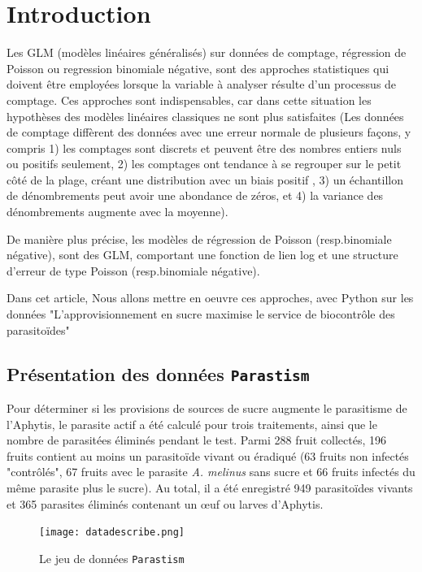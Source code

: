 \documentclass[12pt]{article}
\begin{document}
\newpage

\section{Introduction}

    Les GLM (modèles linéaires généralisés) sur données de comptage, régression de Poisson ou regression binomiale négative, sont des approches statistiques qui doivent être employées lorsque la variable à analyser résulte d’un processus de comptage. Ces approches sont indispensables, car dans cette situation les hypothèses des modèles linéaires classiques ne sont plus satisfaites (Les données de comptage diffèrent des données avec une erreur normale de plusieurs façons, y compris 1) les comptages sont discrets et peuvent être des nombres entiers nuls ou positifs seulement, 2) les comptages ont tendance à se regrouper sur le petit côté de la plage, créant une distribution avec un biais positif , 3) un échantillon de dénombrements peut avoir une abondance de zéros, et 4) la variance des dénombrements augmente avec la moyenne).
    
    De manière plus précise, les modèles de régression de Poisson (resp.binomiale négative), sont des GLM, comportant une fonction de lien log et une structure d’erreur de type Poisson (resp.binomiale négative).
    
    Dans cet article, Nous allons mettre en oeuvre ces approches, avec Python sur les données "L'approvisionnement en sucre maximise le service de biocontrôle des parasitoïdes"
    
    
    \subsection{Présentation des données \texttt{Parastism}}
    Pour déterminer si les provisions de sources de sucre augmente le parasitisme de l'Aphytis,  le parasite actif a été calculé pour trois traitements, ainsi que le nombre de parasitées éliminés pendant le test.
    Parmi 288 fruit collectés, 196 fruits contient au moins un parasitoïde vivant ou éradiqué (63 fruits non infectés "contrôlés", 67 fruits avec le parasite \textit{A. melinus} sans sucre et 66 fruits infectés du même parasite plus le sucre). Au total, il a été enregistré 949 parasitoïdes vivants et 365 parasites éliminés contenant un œuf ou larves d'Aphytis. 
    

    
\begin{figure}[h]
\centering
 \texttt{[image: datadescribe.png]}
 \caption{Le jeu de données \texttt{Parastism }} 
 \end{figure}
 
\end{document}
